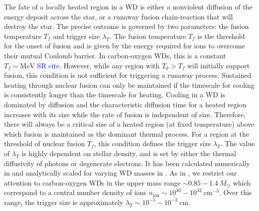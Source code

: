\documentclass[twocolumn,showpacs,preprintnumbers,amsmath,amssymb,prd]{revtex4}
\newcommand{\MeV}{\text{MeV}}
\newcommand{\cm}{\text{cm}}
\begin{document}
The fate of a locally heated region in a WD is either a nonviolent diffusion of the energy deposit across the star, or a runaway fusion chain-reaction that will destroy the star.
The precise outcome is governed by two parameters: the fusion temperature $T_f$ and trigger size $\lambda_T$.
The fusion temperature $T_f$ is the threshold for the onset of fusion and is given by the energy required for ions to overcome their mutual Coulomb barrier.
In carbon-oxygen WDs, this is a constant $T_f \sim \MeV$ \textcolor{blue}{SR cite}.
However, while any region with $T_0 > T_f$ will initially support fusion, this condition is not sufficient for triggering a runaway process.
Sustained heating through nuclear fusion can only be maintained if the timescale for cooling is consistently longer than the timescale for heating. 
Cooling in a WD is dominated by diffusion and the characteristic diffusion time for a heated region increases with its size while the rate of fusion is independent of size. 
Therefore, there will always be a critical size of a heated region (at fixed temperature) above which fusion is maintained as the dominant thermal process.
For a region at the threshold of nuclear fusion $T_f$, this condition defines the trigger size $\lambda_T$.
The value of $\lambda_T$ is highly dependent on stellar density, and is set by either the thermal diffusivity of photons or degenerate electrons.
It has been calculated numerically in \cite{Woosley} and analytically scaled for varying WD masses in \cite{Graham:2015apa}.
As in \cite{Graham:2015apa}, we restrict our attention to carbon-oxygen WDs in the upper mass range $\sim 0.85 - 1.4 ~M_{\odot}$ which correspond to a central number density of ions $n_\text{ion} \sim 10^{30} - 10^{32} ~\cm^{-3}$.
Over this range, the trigger size is approximately $\lambda_T \sim 10^{-5} - 10^{-3} ~\text{cm}$.
\end{document}
